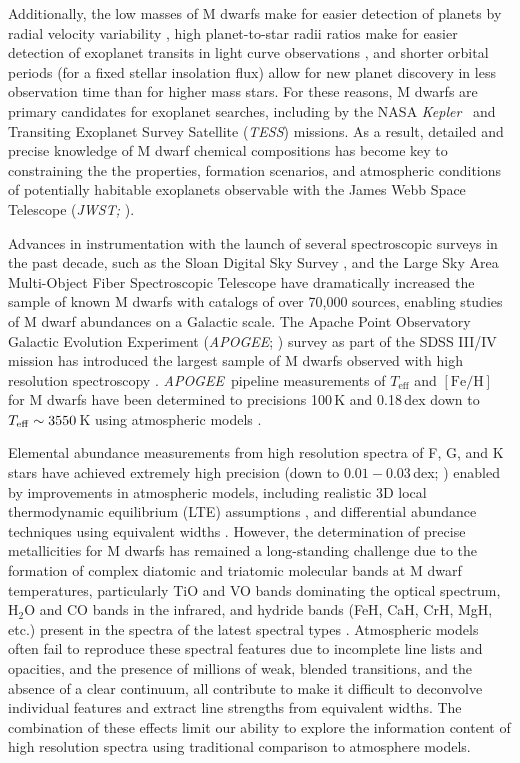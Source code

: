 \documentclass[twocolumn]{aastex62}
\newcommand{\apogee}{\textsl{APOGEE}}
\newcommand{\kepler}{\textsl{Kepler}}
\newcommand{\tess}{\textsl{TESS}}
\newcommand{\teff}{T_{\mathrm{eff}}}
\newcommand{\feh}{[{\mathrm{Fe}/\mathrm{H}}]}
\begin{document}
Additionally, the low masses of M dwarfs make for easier detection of planets by radial velocity variability \citep{Trifonov:2018}, high planet-to-star radii ratios make for easier detection of exoplanet transits in light curve observations \citep{Nutzman:2008}, and shorter orbital periods (for a fixed stellar insolation flux) allow for new planet discovery in less observation time than for higher mass stars. For these reasons, M dwarfs are primary candidates for exoplanet searches, including by the NASA \kepler\ \citep[e.g.,][]{Dressing2015} and Transiting Exoplanet Survey Satellite (\tess) \citep[e.g.,][]{Muirhead:2018} missions. As a result, detailed and precise knowledge of M dwarf chemical compositions has become key to constraining the the properties, formation scenarios, and atmospheric conditions of potentially habitable exoplanets observable with the James Webb Space Telescope ({\sl JWST;} \citealt{Clampin2008}). 

Advances in instrumentation with the launch of several spectroscopic surveys in the past decade, such as the Sloan Digital Sky Survey \citep[SDSS;][]{Eisenstein:2011,Blanton:2017}, and the Large Sky Area Multi-Object Fiber Spectroscopic Telescope \citep[LAMOST;][]{Zhao:2012} have dramatically increased the sample of known M dwarfs \citep{West:2011,Guo:2015} with catalogs of over 70,000 sources, enabling studies of M dwarf abundances on a Galactic scale.
The Apache Point Observatory Galactic Evolution Experiment (\apogee; \citealt{Majewski:2015}) survey as part of the SDSS III/IV mission has introduced the largest sample of M dwarfs observed with high resolution spectroscopy \citep{Desphande:2013}. \apogee\ pipeline measurements of $\teff$ and $\feh$ \citep{Perez:2016} for M dwarfs have been determined to precisions 100\,K and 0.18\,dex down to $T_{\rm eff}\sim3550\,$K using atmospheric models \citep{Schmidt:2016}. 

Elemental abundance measurements from high resolution spectra of F, G, and K stars have achieved extremely high precision (down to $0.01-0.03$\,dex; \citealt{Nissen2018}) enabled by improvements in atmospheric models, including realistic 3D local thermodynamic equilibrium (LTE) assumptions \citep{Asplund2005}, and differential abundance techniques using equivalent widths \citep{Bedell2014}. However, the determination of precise metallicities for M dwarfs has remained a long-standing challenge due to the formation of complex diatomic and triatomic molecular bands at M dwarf temperatures, particularly TiO and VO bands dominating the optical spectrum, H$_2$O and CO bands in the infrared, and hydride bands (FeH, CaH, CrH, MgH, etc.) present in the spectra of the latest spectral types \citep{Allard1997}.
Atmospheric models often fail to reproduce these spectral features \citep[e.g.,][]{Mann:2013c} due to incomplete line lists and opacities, and the presence of millions of weak, blended transitions, and the absence of a clear continuum, all contribute to make it difficult to deconvolve individual features and extract line strengths from equivalent widths. The combination of these effects limit our ability to explore the information content of high resolution spectra using traditional comparison to atmosphere models.
\end{document}
